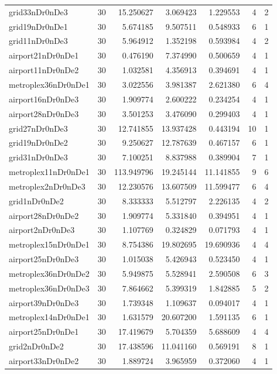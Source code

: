 \begin{longtable}{|l|r|r|r|r|r|r|}
grid33nDr0nDe3 & 30 & 15.250627 & 3.069423 & 1.229553 & 4 & 2 \\
grid19nDr0nDe1 & 30 & 5.674185 & 9.507511 & 0.548933 & 6 & 1 \\
grid11nDr0nDe3 & 30 & 5.964912 & 1.352198 & 0.593984 & 4 & 2 \\
airport21nDr0nDe1 & 30 & 0.476190 & 7.374990 & 0.500659 & 4 & 1 \\
airport11nDr0nDe2 & 30 & 1.032581 & 4.356913 & 0.394691 & 4 & 1 \\
metroplex36nDr0nDe1 & 30 & 3.022556 & 3.981387 & 2.621380 & 6 & 4 \\
airport16nDr0nDe3 & 30 & 1.909774 & 2.600222 & 0.234254 & 4 & 1 \\
airport28nDr0nDe3 & 30 & 3.501253 & 3.476090 & 0.299403 & 4 & 1 \\
grid27nDr0nDe3 & 30 & 12.741855 & 13.937428 & 0.443194 & 10 & 1 \\
grid19nDr0nDe2 & 30 & 9.250627 & 12.787639 & 0.467157 & 6 & 1 \\
grid31nDr0nDe3 & 30 & 7.100251 & 8.837988 & 0.389904 & 7 & 1 \\
metroplex11nDr0nDe1 & 30 & 113.949796 & 19.245144 & 11.141855 & 9 & 6 \\
metroplex2nDr0nDe3 & 30 & 12.230576 & 13.607509 & 11.599477 & 6 & 4 \\
grid1nDr0nDe2 & 30 & 8.333333 & 5.512797 & 2.226135 & 4 & 2 \\
airport28nDr0nDe2 & 30 & 1.909774 & 5.331840 & 0.394951 & 4 & 1 \\
airport2nDr0nDe3 & 30 & 1.107769 & 0.324829 & 0.071793 & 4 & 1 \\
metroplex15nDr0nDe1 & 30 & 8.754386 & 19.802695 & 19.690936 & 4 & 4 \\
airport25nDr0nDe3 & 30 & 1.015038 & 5.426943 & 0.523450 & 4 & 1 \\
metroplex36nDr0nDe2 & 30 & 5.949875 & 5.528941 & 2.590508 & 6 & 3 \\
metroplex36nDr0nDe3 & 30 & 7.864662 & 5.399319 & 1.842885 & 5 & 2 \\
airport39nDr0nDe3 & 30 & 1.739348 & 1.109637 & 0.094017 & 4 & 1 \\
metroplex14nDr0nDe1 & 30 & 1.631579 & 20.607200 & 1.591135 & 6 & 1 \\
airport25nDr0nDe1 & 30 & 17.419679 & 5.704359 & 5.688609 & 4 & 4 \\
grid2nDr0nDe2 & 30 & 17.438596 & 11.041160 & 0.569191 & 8 & 1 \\
airport33nDr0nDe2 & 30 & 1.889724 & 3.965959 & 0.372060 & 4 & 1 \\

\end{longtable}
